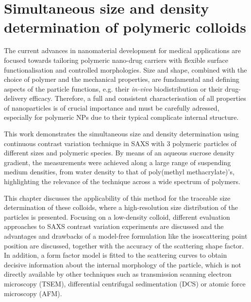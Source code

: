 \chapter{Simultaneous size and density determination of polymeric colloids}
\label{chap:simultaneous_size_density}
The current advances in nanomaterial development for medical applications are focused towards tailoring polymeric nano-drug carriers with flexible surface functionalisation and controlled morphologies\citep{euliss_imparting_2006,yang_shape-memory_2005}. Size and shape, combined with the choice of polymer and the mechanical properties, are fundamental and defining aspects of the particle functions, e.g. their \emph{in-vivo} biodistribution\citep{vittaz_effect_1996,mitragotri_physical_2009,doshi_designer_2009} or their drug-delivery efficacy\citep{powers_research_2006}. Therefore, a full and consistent characterisation of all properties of nanoparticles is of crucial importance and must be carefully adressed, especially for polymeric NPs due to their typical complicate internal structure.

This work demonstrates the simultaneous size and density determination using continuous contrast variation technique in SAXS with 3 polymeric particles of different sizes and polymeric species. By means of an aqueous sucrose density gradient, the measurements were achieved along a large range of suspending medium densities, from water density to that of poly(methyl methacrylate)'s, highlighting the relevance of the technique across a wide spectrum of polymers.

This chapter discusses the applicability of this method for the traceable size determination of these colloids, where a high-resolution size distribution of the particles is presented. Focusing on a low-density colloid, different evaluation approaches to SAXS contrast variation experiments are discussed and the advantages and drawbacks of a model-free formulation like the isoscattering point position are discussed, together with the accuracy of the scattering shape factor. In addition, a form factor model is fitted to the scattering curves to obtain decisive information about the internal morphology of the particle, which is not directly available by other techniques such as transmission scanning electron microscopy (TSEM), differential centrifugal sedimentation (DCS)\citep{fielding_correcting_2012} or atomic force microscopy (AFM). 


